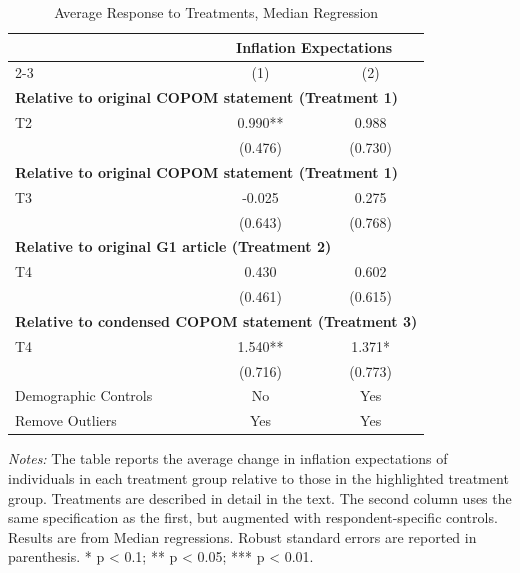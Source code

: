 
\begin{table}[H]
\centering
\caption{Average Response to Treatments, Median Regression}
\label{tab:a2}
\begin{tabular}{lcc}
\toprule
\textbf{} & \multicolumn{2}{c}{\textbf{Inflation Expectations}}\\ 
\cmidrule(lr){2-3}
& (1) & (2) \\ 
\midrule
\multicolumn{3}{l}{\textbf{Relative to original COPOM statement (Treatment 1)}} \\
T2 & 0.990** & 0.988 \\
& (0.476) & (0.730) \\
\midrule
\multicolumn{3}{l}{\textbf{Relative to original COPOM statement (Treatment 1)}} \\
T3 & -0.025 & 0.275 \\
& (0.643) & (0.768) \\
\midrule
\multicolumn{3}{l}{\textbf{Relative to original G1 article (Treatment 2)}} \\
T4 & 0.430 & 0.602 \\
& (0.461) & (0.615) \\
\midrule
\multicolumn{3}{l}{\textbf{Relative to condensed COPOM statement (Treatment 3)}} \\
T4 & 1.540** & 1.371* \\
& (0.716) & (0.773) \\
\midrule
Demographic Controls & No & Yes \\
Remove Outliers & Yes & Yes \\
\bottomrule
\end{tabular}
\begin{minipage}{\textwidth}
    {\fontsize{8}{8}\selectfont\textit{Notes:} The table reports the average change in inflation expectations of individuals in each treatment group relative to those in the highlighted treatment group. Treatments are described in detail in the text. The second column uses the same specification as the first, but augmented with respondent-specific controls. Results are from Median regressions. Robust standard errors are reported in parenthesis. * p < 0.1; ** p < 0.05; *** p < 0.01.}
\end{minipage}
\end{table}
